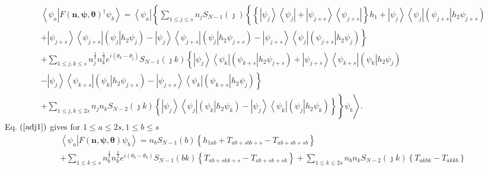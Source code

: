\documentclass[aps,preprint]{revtex4}%
\begin{document}
\begin{align}
&  \left\langle \psi_{a}\left\vert F\left(  \mathbf{n},\mathbf{\psi
},\mathbf{\theta}\right)  ^{\dagger}\psi_{b}\right.  \right\rangle
=\left\langle \overset{\overset{}{}}{\psi_{a}}\right\vert \left\{  \sum_{1\leq
j\leq s}n_{j}S_{N-1}\left(  \jmath\right)  \left\{  \left\{  \left\vert
\psi_{j}\right\rangle \left\langle \psi_{j}\right\vert +\left\vert \psi
_{j+s}\right\rangle \left\langle \psi_{j+s}\right\vert \right\}
h_{1}+\left\vert \psi_{j}\right\rangle \left\langle \psi_{j}\right\vert
\left(  \left.  \psi_{j+s}\right\vert h_{2}\psi_{j+s}\right)  \right.  \right.
\nonumber\\
&  \left.  +\left\vert \psi_{j+s}\right\rangle \left\langle \psi
_{j+s}\right\vert \left(  \left.  \psi_{j}\right\vert h_{2}\psi_{j}\right)
-\left\vert \psi_{j}\right\rangle \left\langle \psi_{j+s}\right\vert \left(
\left.  \psi_{j}\right\vert h_{2}\psi_{j+s}\right)  -\left\vert \psi
_{j+s}\right\rangle \left\langle \psi_{j}\right\vert \left(  \left.
\psi_{j+s}\right\vert h_{2}\psi_{j}\right)  \right\} \nonumber\\
&  +\sum_{1\leq j,k\leq s}n_{j}^{\frac{1}{2}}n_{k}^{\frac{1}{2}}e^{i\left(
\theta_{k}-\theta_{j}\right)  }S_{N-1}\left(  \jmath k\right)  \left\{
\left\vert \psi_{j}\right\rangle \left\langle \psi_{k}\right\vert \left(
\left.  \psi_{k+s}\right\vert h_{2}\psi_{j+s}\right)  +\left\vert \psi
_{j+s}\right\rangle \left\langle \psi_{k+s}\right\vert \left(  \left.
\psi_{k}\right\vert h_{2}\psi_{j}\right)  \right. \nonumber\\
&  \left.  -\left\vert \psi_{j}\right\rangle \left\langle \psi_{k+s}%
\right\vert \left(  \left.  \psi_{k}\right\vert h_{2}\psi_{j+s}\right)
-\left\vert \psi_{j+s}\right\rangle \left\langle \psi_{k}\right\vert \left(
\left.  \psi_{k+s}\right\vert h_{2}\psi_{j}\right)  \right\} \nonumber\\
&  \left.  \left.  +\sum_{1\leq j,k\leq2s}n_{j}n_{k}S_{N-2}\left(  \jmath
k\right)  \overset{}{\left\{  \left\vert \psi_{j}\right\rangle \left\langle
\psi_{j}\right\vert \left(  \left.  \psi_{k}\right\vert h_{2}\psi_{k}\right)
-\left\vert \psi_{j}\right\rangle \left\langle \psi_{k}\right\vert \left(
\left.  \psi_{j}\right\vert h_{2}\psi_{k}\right)  \right\}  }\right\}
\psi_{b}\right\rangle . \label{adj2}%
\end{align}
Eq. $\left(  \ref{adj1}\right)  $ gives for $1\leq a\leq2s,1\leq b\leq s$
\begin{align}
&  \left\langle \psi_{a}\left\vert F\left(  \mathbf{n},\mathbf{\psi
},\mathbf{\theta}\right)  \psi_{b}\right.  \right\rangle =n_{b}S_{N-1}\left(
b\right)  \left\{  h_{1ab}+T_{ab+sbb+s}-T_{ab+sb+sb}\right\} \nonumber\\
&  +\sum_{1\leq k\leq s}n_{b}^{\frac{1}{2}}n_{k}^{\frac{1}{2}}e^{i\left(
\theta_{b}-\theta_{k}\right)  }S_{N-1}\left(  bk\right)  \left\{
T_{ab+skk+s}-T_{ab+sk+sk}\right\}  +\sum_{1\leq k\leq2s}n_{b}n_{k}%
S_{N-2}\left(  \jmath k\right)  \left\{  T_{akbk}-T_{akkb}\right\}
\end{align}
\end{document}
